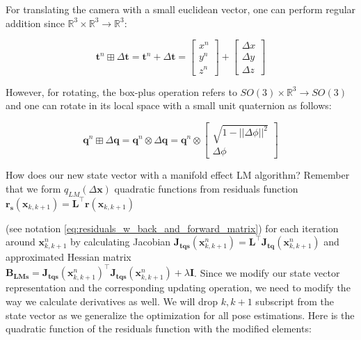 \documentclass[12pt]{report}
\numberwithin{figure}{section}
\newcommand{\R}{\mathbb{R}}
\begin{document}
\begin{appendices}
For translating the camera with a small euclidean vector, 
one can perform regular addition since $\R^3 \times \R^3 \rightarrow \R^3$:

\begin{equation}
  \mathbf{t}^n \boxplus \Delta \mathbf{t} = 
  \mathbf{t}^n + \Delta \mathbf{t} =
  \begin{bmatrix} x^{n} \\ y^{n} \\ z^{n} \end{bmatrix} + 
  \begin{bmatrix} \Delta x \\ \Delta y \\ \Delta z \end{bmatrix}
\end{equation}

However, for rotating, the box-plus operation refers to 
$SO(3) \times \R^3 \rightarrow SO(3)$ and one can rotate in its local space 
with a small unit quaternion as follows:

\begin{equation}
  \mathbf{q}^n \boxplus \Delta \mathbf{q} = 
  \mathbf{q}^n \otimes \Delta \mathbf{q} = 
  \mathbf{q}^n \otimes 
  \begin{bmatrix} \sqrt{1-||\Delta \phi||^2} \\ \Delta \phi \end{bmatrix}
\end{equation}

How does our new state vector with a manifold effect LM algorithm? 
Remember that we form $q_{LM}(\Delta \mathbf{x})$ quadratic functions 
from residuals function 
$\mathbf{r_s}(\mathbf{x}_{k,k+1})=\mathbf{L}^\top\mathbf{r}(\mathbf{x}_{k,k+1})$
 
(see notation \eqref{eq:residuals_w_back_and_forward_matrix})
for each iteration around $\mathbf{x}^n_{k,k+1}$ by calculating Jacobian 
$\mathbf{J_{tqs}}(\mathbf{x}^n_{k,k+1})=\mathbf{L}^\top\mathbf{J_{tq}}(\mathbf{x}^n_{k,k+1})$
and 
approximated Hessian matrix \\
$\mathbf{B_{LMs}}=\mathbf{J_{tqs}}(\mathbf{x}^n_{k,k+1})^\top\mathbf{J_{tqs}}(\mathbf{x}^n_{k,k+1})
 + \lambda \mathbf{I}$.
Since we modify our state vector representation 
and the corresponding updating operation, we need to modify the way we calculate 
derivatives as well. We will drop $k,k+1$ subscript from the state vector 
as we generalize the 
optimization for all pose estimations. 
Here is the quadratic function of the residuals function with the modified elements:


\end{appendices}
\end{document}
